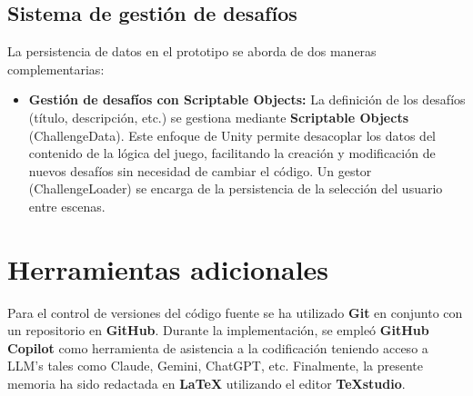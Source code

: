 \subsection{ Sistema de gestión de desafíos}
 La persistencia de datos en el prototipo se aborda de dos maneras complementarias:
\begin{itemize}
	\item \textbf{Gestión de desafíos con Scriptable Objects:} La definición de los desafíos (título, descripción, etc.) se gestiona mediante \textbf{Scriptable Objects} (ChallengeData). Este enfoque de Unity permite desacoplar los datos del contenido de la lógica del juego, facilitando la creación y modificación de nuevos desafíos sin necesidad de cambiar el código. Un gestor (ChallengeLoader) se encarga de la persistencia de la selección del usuario entre escenas.

\end{itemize}

\section{Herramientas adicionales}
Para el control de versiones del código fuente se ha utilizado \textbf{Git} en conjunto con un repositorio en \textbf{GitHub}. Durante la implementación, se empleó \textbf{GitHub Copilot} como herramienta de asistencia a la codificación teniendo acceso a LLM's tales como Claude, Gemini, ChatGPT, etc. Finalmente, la presente memoria ha sido redactada en \textbf{LaTeX} utilizando el editor \textbf{TeXstudio}.
